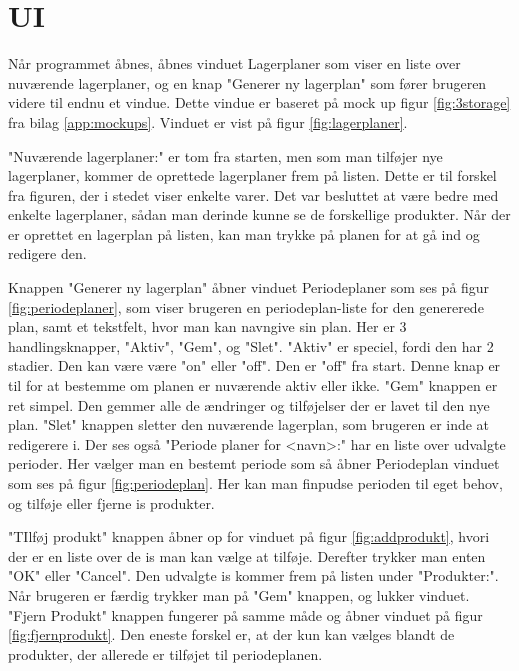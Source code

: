 \section{UI} 
Når programmet åbnes, åbnes vinduet Lagerplaner som viser en liste over nuværende lagerplaner, og en knap "Generer ny lagerplan" som fører brugeren videre til endnu et vindue. Dette vindue er baseret på mock up figur \ref{fig:3storage} fra bilag \ref{app:mockups}. Vinduet er vist på figur \ref{fig:lagerplaner}. 

"Nuværende lagerplaner:" er tom fra starten, men som man tilføjer nye lagerplaner, kommer de oprettede lagerplaner frem på listen. Dette er til forskel fra figuren, der i stedet viser enkelte varer. Det var besluttet at være bedre med enkelte lagerplaner, sådan man derinde kunne se de forskellige produkter. 
Når der er oprettet en lagerplan på listen, kan man trykke på planen for at gå ind og redigere den. 

Knappen "Generer ny lagerplan" åbner vinduet Periodeplaner som ses på figur \ref{fig:periodeplaner}, som viser brugeren en periodeplan-liste for den genererede plan, samt et tekstfelt, hvor man kan navngive sin plan. Her er 3 handlingsknapper, "Aktiv", "Gem", og "Slet". 
"Aktiv" er speciel, fordi den har 2 stadier. Den kan være være "on" eller "off". Den er "off" fra start. Denne knap er til for at bestemme om planen er nuværende aktiv eller ikke. "Gem" knappen er ret simpel. Den gemmer alle de ændringer og tilføjelser der er lavet til den nye plan. "Slet" knappen sletter den nuværende lagerplan, som brugeren er inde at redigerere i. 
Der ses også "Periode planer for <navn>:" har en liste over udvalgte perioder. Her vælger man en bestemt periode som så åbner Periodeplan vinduet som ses på figur \ref{fig:periodeplan}. Her kan man finpudse perioden til eget behov, og tilføje eller fjerne is produkter.   

"TIlføj produkt" knappen åbner op for vinduet på figur \ref{fig:addprodukt}, hvori der er en liste over de is man kan vælge at tilføje. Derefter trykker man enten "OK" eller "Cancel". Den udvalgte is kommer frem på listen under "Produkter:". Når brugeren er færdig trykker man på "Gem" knappen, og lukker vinduet. 
"Fjern Produkt" knappen fungerer på samme måde og åbner vinduet på figur \ref{fig:fjernprodukt}. Den eneste forskel er, at der kun kan vælges blandt de produkter, der allerede er tilføjet til periodeplanen.

